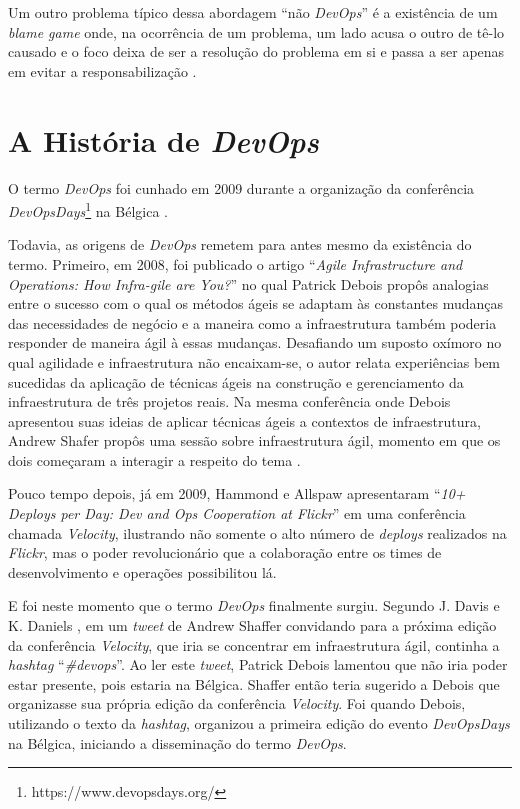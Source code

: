 Um outro problema típico dessa abordagem ``não \textit{DevOps}'' é a existência
de um \textit{blame game} onde, na ocorrência de um problema, um lado acusa
o outro de tê-lo causado e o foco deixa de ser a resolução do problema em si
e passa a ser apenas em evitar a responsabilização \cite{toward_unified_model}.

\section{A História de \textit{DevOps}}\label{secao_historico_devops}

O termo \textit{DevOps} foi cunhado em 2009 durante a organização da
conferência \textit{DevOpsDays}\footnote{https://www.devopsdays.org/} na
Bélgica \cite{devops_for_developers}.

Todavia, as origens de \textit{DevOps} remetem para antes mesmo da existência
do termo. Primeiro, em 2008, foi publicado o artigo ``\textit{Agile
Infrastructure and Operations: How Infra-gile are You?}''
\cite{agile_infra_operations} no qual
Patrick Debois propôs analogias entre o sucesso com o qual os métodos ágeis
se adaptam às constantes mudanças das necessidades de negócio e a maneira como
a infraestrutura também poderia responder de maneira ágil à essas mudanças.
Desafiando um suposto oxímoro no qual agilidade e infraestrutura não
encaixam-se, o autor relata experiências bem sucedidas da aplicação de técnicas
ágeis na construção e gerenciamento da infraestrutura de três projetos reais.
Na mesma conferência onde Debois apresentou suas ideias de aplicar técnicas
ágeis a contextos de infraestrutura, Andrew Shafer propôs uma sessão sobre
infraestrutura ágil, momento em que os dois começaram a interagir a respeito do
tema \cite{effective_devops}.

Pouco tempo depois, já em 2009, Hammond e Allspaw apresentaram ``\textit{10+ Deploys
per Day: Dev and Ops Cooperation at Flickr}'' \cite{flickr} em uma conferência
chamada \textit{Velocity}, ilustrando não somente o alto número de
\textit{deploys} realizados na \textit{Flickr}, mas o poder revolucionário que
a colaboração entre os times de desenvolvimento e operações possibilitou lá.

E foi neste momento que o termo \textit{DevOps} finalmente surgiu. Segundo
J. Davis e K. Daniels \cite{effective_devops}, em um \textit{tweet} de Andrew
Shaffer convidando para a próxima edição da conferência \textit{Velocity}, que
iria se concentrar em infraestrutura ágil, continha a \textit{hashtag}
``\textit{\#devops}''. Ao ler este \textit{tweet}, Patrick Debois lamentou que
não iria poder estar presente, pois estaria na Bélgica. Shaffer então teria
sugerido a Debois que organizasse sua própria edição da conferência
\textit{Velocity}. Foi quando Debois, utilizando o texto da \textit{hashtag},
organizou a primeira edição do evento \textit{DevOpsDays} na Bélgica,
iniciando a disseminação do termo \textit{DevOps}.

